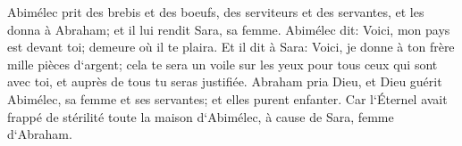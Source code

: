 \verse Abimélec prit des brebis et des boeufs, des serviteurs et des servantes, et les donna à Abraham; et il lui rendit Sara, sa femme. 
\verse Abimélec dit: Voici, mon pays est devant toi; demeure où il te plaira. 
\verse Et il dit à Sara: Voici, je donne à ton frère mille pièces d`argent; cela te sera un voile sur les yeux pour tous ceux qui sont avec toi, et auprès de tous tu seras justifiée. 
\verse Abraham pria Dieu, et Dieu guérit Abimélec, sa femme et ses servantes; et elles purent enfanter. 
\verse Car l`Éternel avait frappé de stérilité toute la maison d`Abimélec, à cause de Sara, femme d`Abraham. 

